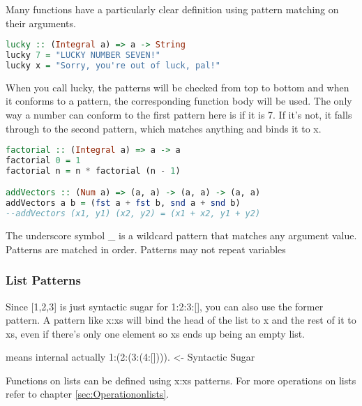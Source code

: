 Many functions have a particularly clear definition using pattern matching on their arguments.

\begin{lstlisting}[language=Haskell]
lucky :: (Integral a) => a -> String  
lucky 7 = "LUCKY NUMBER SEVEN!"  
lucky x = "Sorry, you're out of luck, pal!" 
\end{lstlisting}

When you call lucky, the patterns will be checked from top to bottom and when it conforms to a pattern, the corresponding function body will be used. The only way a number can conform to the first pattern here is if it is 7. If it's not, it falls through to the second pattern, which matches anything and binds it to x.

\begin{lstlisting}[language=Haskell]
factorial :: (Integral a) => a -> a  
factorial 0 = 1  
factorial n = n * factorial (n - 1) 

addVectors :: (Num a) => (a, a) -> (a, a) -> (a, a)  
addVectors a b = (fst a + fst b, snd a + snd b)  
--addVectors (x1, y1) (x2, y2) = (x1 + x2, y1 + y2)
\end{lstlisting}

\begin{tcolorbox}[colback=red!5!white,colframe=red!75!black]
The underscore symbol \_ is a wildcard pattern that matches any argument value.
Patterns are matched in order.
Patterns may not repeat variables
\end{tcolorbox}

\hypertarget{list-patterns}{%
\subsubsection{List Patterns}\label{list-patterns}}

Since [1,2,3] is just syntactic sugar for 1:2:3:[], you can also use the former pattern. A pattern like x:xs will bind the head of the list to x and the rest of it to xs, even if there's only one element so xs ends up being an empty list. 

\begin{tcolorbox}[colback=red!5!white,colframe=red!75!black]
[1,2,3,4] means internal actually 1:(2:(3:(4:[]))). <- Syntactic Sugar
\end{tcolorbox}

Functions on lists can be defined using x:xs patterns. For more operations on lists refer to chapter \ref{sec:Operationonlists}.

